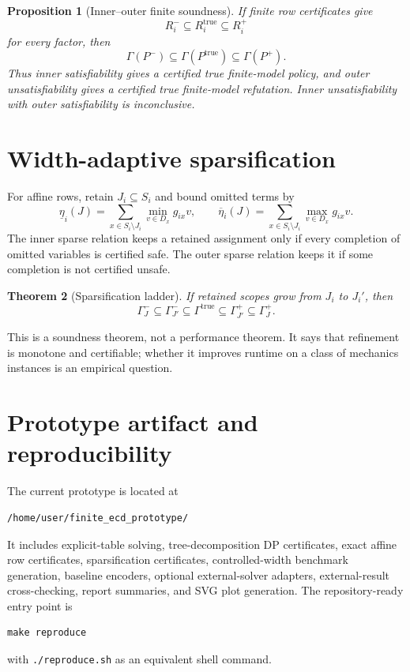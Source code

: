 \documentclass[11pt]{article}
\theoremstyle{plain}
\newtheorem{theorem}{Theorem}[section]
\newtheorem{proposition}[theorem]{Proposition}
\theoremstyle{definition}
\theoremstyle{remark}
\begin{document}
\begin{proposition}[Inner--outer finite soundness]
If finite row certificates give
\[
  R_i^-\subseteq R_i^{\mathrm{true}}\subseteq R_i^+
\]
for every factor, then
\[
  \Gamma(P^-)\subseteq\Gamma(P^{\mathrm{true}})\subseteq\Gamma(P^+).
\]
Thus inner satisfiability gives a certified true finite-model policy, and outer
unsatisfiability gives a certified true finite-model refutation.  Inner
unsatisfiability with outer satisfiability is inconclusive.
\end{proposition}

\section{Width-adaptive sparsification}
\label{sec:sparsification}

For affine rows, retain \(J_i\subseteq S_i\) and bound omitted terms by
\[
\underline\eta_i(J)=
\sum_{x\in S_i\setminus J_i}\min_{v\in D_x}g_{ix}v,
\qquad
\overline\eta_i(J)=
\sum_{x\in S_i\setminus J_i}\max_{v\in D_x}g_{ix}v.
\]
The inner sparse relation keeps a retained assignment only if every completion
of omitted variables is certified safe.  The outer sparse relation keeps it if
some completion is not certified unsafe.

\begin{theorem}[Sparsification ladder]
If retained scopes grow from \(J_i\) to \(J_i'\), then
\[
  \Gamma^-_J
  \subseteq
  \Gamma^-_{J'}
  \subseteq
  \Gamma^{\mathrm{true}}
  \subseteq
  \Gamma^+_{J'}
  \subseteq
  \Gamma^+_J.
\]
\end{theorem}

This is a soundness theorem, not a performance theorem.  It says that refinement
is monotone and certifiable; whether it improves runtime on a class of mechanics
instances is an empirical question.

\section{Prototype artifact and reproducibility}
\label{sec:artifact}

The current prototype is located at
\begin{verbatim}
/home/user/finite_ecd_prototype/
\end{verbatim}
It includes explicit-table solving, tree-decomposition DP certificates, exact
affine row certificates, sparsification certificates, controlled-width benchmark
generation, baseline encoders, optional external-solver adapters, external-result
cross-checking, report summaries, and SVG plot generation.  The repository-ready
entry point is
\begin{verbatim}
make reproduce
\end{verbatim}
with \texttt{./reproduce.sh} as an equivalent shell command.
\end{document}
